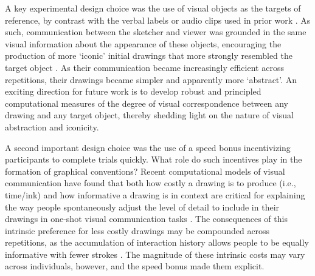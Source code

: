 \documentclass[11pt,letterpaper]{article}
\begin{document}
A key experimental design choice was the use of visual objects as the targets of reference, by contrast with the verbal labels or audio clips used in prior work \cite{GalantucciGarrod11_ExperimentalSemiotics,fay2010interactive}. %
As such, communication between the sketcher and viewer was grounded in the same visual information about the appearance of these objects, encouraging the production of more `iconic' initial drawings that more strongly resembled the target object \cite{verhoef2016iconicity,perlman2015iconicity}.
As their communication became increasingly efficient across repetitions, their drawings became simpler and apparently more `abstract'.
An exciting direction for future work is to develop robust and principled computational measures of the degree of visual correspondence between any drawing and any target object, thereby shedding light on the nature of visual abstraction and iconicity.

A second important design choice was the use of a speed bonus incentivizing participants to complete trials quickly.
What role do such incentives play in the formation of graphical conventions?
Recent computational models of visual communication have found that both how costly a drawing is to produce (i.e., time/ink) and how informative a drawing is in context are critical for explaining the way people spontaneously adjust the level of detail to include in their drawings in one-shot visual communication tasks \cite{fan2019pragmatic}.
The consequences of this intrinsic preference for less costly drawings may be compounded across repetitions, as the accumulation of interaction history allows people to be equally informative with fewer strokes \cite{HawkinsFrankGoodman17_ConventionFormation}.
The magnitude of these intrinsic costs may vary across individuals, however, and the speed bonus made them explicit.

\end{document}
